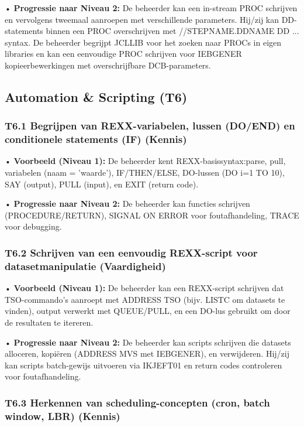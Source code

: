 • \textbf{Progressie naar Niveau 2:} De beheerder kan een in-stream PROC schrijven en vervolgens tweemaal aanroepen met verschillende parameters. Hij/zij kan DD-statements binnen een PROC overschrijven met {//STEPNAME.DDNAME DD ...} syntax. De beheerder begrijpt {JCLLIB} voor het zoeken naar PROCs in eigen libraries en kan een eenvoudige PROC schrijven voor IEBGENER kopieerbewerkingen met overschrijfbare DCB-parameters.

\subsection{Automation \& Scripting (T6)}

\subsubsection{T6.1 Begrijpen van REXX-variabelen, lussen (DO/END) en conditionele statements (IF) (Kennis)}

• \textbf{Voorbeeld (Niveau 1):} De beheerder kent REXX-basissyntax:parse, pull,  variabelen ({naam = 'waarde'}), IF/THEN/ELSE, DO-lussen ({DO i=1 TO 10}), SAY (output), PULL (input), en EXIT (return code).

• \textbf{Progressie naar Niveau 2:} De beheerder kan functies schrijven (PROCEDURE/RETURN), SIGNAL ON ERROR voor foutafhandeling, TRACE voor debugging.

\subsubsection{T6.2 Schrijven van een eenvoudig REXX-script voor datasetmanipulatie (Vaardigheid)}

• \textbf{Voorbeeld (Niveau 1):} De beheerder kan een REXX-script schrijven dat TSO-commando's aanroept met ADDRESS TSO (bijv. LISTC om datasets te vinden), output verwerkt met QUEUE/PULL, en een DO-lus gebruikt om door de resultaten te itereren.

• \textbf{Progressie naar Niveau 2:} De beheerder kan scripts schrijven die datasets alloceren, kopiëren (ADDRESS MVS met IEBGENER), en verwijderen. Hij/zij kan scripts batch-gewijs uitvoeren via IKJEFT01 en return codes controleren voor foutafhandeling.

\subsubsection{T6.3 Herkennen van scheduling-concepten (cron, batch window, LBR) (Kennis)}

